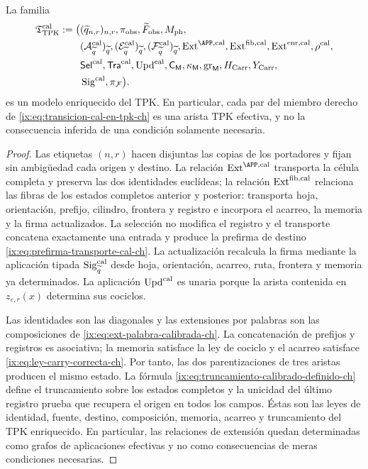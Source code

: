 \begin{proposition}
\label{ix:prop:modelo-tpk-calibrado-ch}
La familia
\[
\begin{aligned}
 \mathfrak T_{\rm TPK}^{\rm cal}:=\bigl(
 &(\widetilde q_{n,r})_{n,r},\pi_{\rm obs},
   \widetilde F_{\rm obs},M_{\rm ph},\\
 &(\mathcal A_{\widetilde q}^{\rm cal})_{\widetilde q},
   (\mathcal E_{\widetilde q}^{\rm cal})_{\widetilde q},
   (\mathcal F_{\widetilde q}^{\rm cal})_{\widetilde q},
   \operatorname{Ext}^{\APP,\rm cal},
   \operatorname{Ext}^{\rm fib,cal},
   \operatorname{Ext}^{\rm enr,cal},\rho^{\rm cal},\\
 &\mathsf{Sel}^{\rm cal},\mathsf{Tra}^{\rm cal},
   \operatorname{Upd}^{\rm cal},\mathsf C_{\mathsf M},
   \kappa_{\mathsf M},\operatorname{gr}_{\mathsf M},
   H_{\rm Carr},Y_{\rm Carr},\\
 &\operatorname{Sig}^{\rm cal},\pi_{\mathcal F}\bigr).
\end{aligned}
\]
es un modelo enriquecido del TPK. En particular, cada par del miembro derecho
de \eqref{ix:eq:transicion-cal-en-tpk-ch} es una arista TPK efectiva, y no la
consecuencia inferida de una condición solamente necesaria.
\end{proposition}

\begin{proof}
Las etiquetas \((n,r)\) hacen disjuntas las copias de los portadores y fijan
sin ambigüedad cada origen y destino. La relación
\(\operatorname{Ext}^{\APP,\rm cal}\) transporta la célula completa y
preserva las dos identidades euclídeas; la relación
\(\operatorname{Ext}^{\rm fib,cal}\) relaciona las fibras de los estados
completos anterior y posterior: transporta hoja, orientación, prefijo,
cilindro, frontera y registro e incorpora el acarreo, la memoria y la firma
actualizados. La selección no modifica el registro y el transporte concatena
exactamente una entrada y produce la prefirma de destino
\eqref{ix:eq:prefirma-transporte-cal-ch}. La actualización recalcula la firma mediante la
aplicación tipada \(\operatorname{Sig}^{\rm cal}_{\widetilde q}\) desde
hoja, orientación, acarreo, ruta, frontera y memoria ya determinados. La aplicación
\(\operatorname{Upd}^{\rm cal}\) es unaria porque la arista contenida en
\(z_{\varepsilon,r}(x)\) determina sus cociclos.

Las identidades son las diagonales y las extensiones por palabras son las
composiciones de \eqref{ix:eq:ext-palabra-calibrada-ch}. La concatenación de
prefijos y registros es asociativa; la memoria satisface la ley de cociclo y
el acarreo satisface
\eqref{ix:eq:ley-carry-correcta-ch}. Por tanto, las dos parentizaciones de tres
aristas producen el mismo estado. La fórmula
\eqref{ix:eq:truncamiento-calibrado-definido-ch} define el truncamiento sobre
los estados completos y la unicidad del último registro prueba que recupera
el origen en todos los campos. Éstas son las leyes de identidad, fuente,
destino, composición, memoria, acarreo y truncamiento del TPK enriquecido.
En particular, las relaciones de extensión quedan determinadas como grafos
de aplicaciones efectivas y no como consecuencias de meras condiciones
necesarias.
\end{proof}

